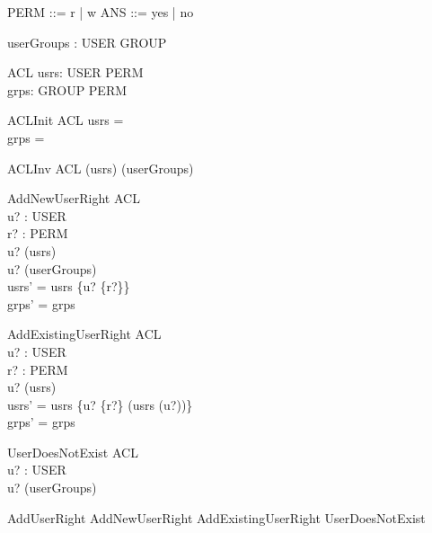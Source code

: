 \begin{zed}
\also
PERM ::= r | w
\also
ANS ::= yes | no 
\end{zed}

\begin{axdef}
userGroups : USER \pfun \power GROUP
\end{axdef}

\begin{schema}{ACL}
usrs: USER \pfun \power PERM \\
grps: GROUP \pfun \power PERM
\end{schema}

\begin{schema}{ACLInit}
ACL
\where
usrs = \emptyset \\
grps = \emptyset
\end{schema}

\begin{schema}{ACLInv}
ACL
\where
\dom (usrs) \subseteq \dom (userGroups)
\end{schema}

\begin{schema}{AddNewUserRight}
\Delta ACL \\
u? : USER \\ 
r? : PERM \\
\where 
u? \notin \dom (usrs) \\
u? \in \dom (userGroups) \\
usrs' = usrs \oplus \{u? \mapsto \{r?\}\} \\
grps' = grps
\end{schema}

\begin{schema}{AddExistingUserRight}
\Delta ACL \\
u? : USER \\ 
r? : PERM \\
\where 
u? \in \dom (usrs) \\
usrs' = usrs \oplus \{u? \mapsto \{r?\} \cup (usrs (u?))\} \\
grps' = grps
\end{schema}

\begin{schema}{UserDoesNotExist}
\Xi ACL \\
u? : USER \\
\where 
u? \notin \dom(userGroups)
\end{schema}

\begin{zed}
AddUserRight  AddNewUserRight \lor AddExistingUserRight \lor UserDoesNotExist
\end{zed}

